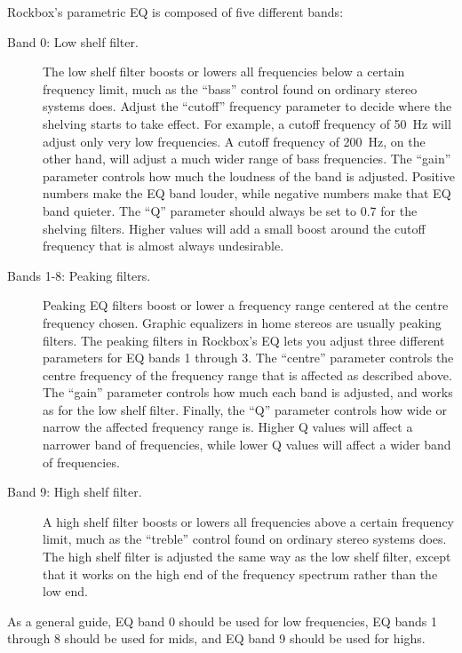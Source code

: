 {  Rockbox's parametric EQ is composed of five different bands:
  \begin{description}
  \item[Band 0: Low shelf filter.]
        The low shelf filter boosts or lowers all frequencies below a certain
        frequency limit, much as the ``bass'' control found on ordinary
        stereo systems does.
        Adjust the ``cutoff'' frequency parameter to decide where the shelving
        starts to take effect. For example, a cutoff frequency of 50~Hz will
        adjust only very low frequencies. A cutoff frequency of 200~Hz, on the
        other hand, will adjust a much wider range of bass frequencies.
        The ``gain'' parameter controls how much the loudness of the band is
        adjusted. Positive numbers make the EQ band louder, while negative
        numbers make that EQ band quieter.
        The ``Q'' parameter should always be set to 0.7 for the shelving
        filters. Higher values will add a small boost around the cutoff
        frequency that is almost always undesirable.
  \item[Bands 1-8: Peaking filters.]
        Peaking EQ filters boost or lower a frequency range centered at the
        centre frequency chosen.
        Graphic equalizers in home stereos are usually peaking
        filters. The peaking filters in Rockbox's EQ lets you adjust three
        different parameters for EQ bands 1 through 3. The ``centre'' parameter
        controls the centre frequency of the frequency range that is affected
        as described above.
        The ``gain'' parameter controls how much each band is adjusted, and
        works as for the low shelf filter.
        Finally, the ``Q'' parameter controls how wide or narrow the affected
        frequency range is. Higher Q values will affect a narrower band of
        frequencies, while lower Q values will affect a wider band of
        frequencies.
  \item[Band 9: High shelf filter.]
        A high shelf filter boosts or lowers all frequencies above a certain
        frequency limit, much as the ``treble'' control found on ordinary
        stereo systems does.
        The high shelf filter is adjusted the same way as the low shelf filter,
        except that it works on the high end of the frequency spectrum rather
        than the low end.
  \end{description}
  As a general guide, EQ band 0 should be used for low frequencies, EQ bands 1
  through 8 should be used for mids, and EQ band 9 should be used for highs.

}
